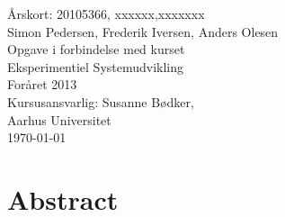 \documentclass[12pt,a4paper,twoside,danish,article]{memoir}
\begin{document}
\frontmatter
\begin{titlingpage}
  \begin{center}
    \mbox{}\vfill
    \vspace{3cm}
    \Large{Årskort: 20105366, xxxxxx,xxxxxxx}\\
    \Large{Simon Pedersen, Frederik Iversen, Anders Olesen}\\
    \vspace{10cm}
    Opgave i forbindelse med kurset\\ Eksperimentiel Systemudvikling\\
    Foråret 2013\\
    \vspace{1cm}
    Kursusansvarlig: Susanne Bødker,\\Aarhus Universitet\\
    \today
  \end{center}
  \clearpage
  \tableofcontents*
\end{titlingpage}

\mainmatter
\setlength{\parskip}{6pt plus 1pt minus 1pt}
\setlength{\parindent}{0cm}
\renewcommand{\baselinestretch}{1.6}\normalsize %

\renewcommand{\chaptermark}[1]{\markboth{\thechapter.
    #1}{\thechapter. #1}} %
\renewcommand{\bibmark}{\markboth{\bibname}{\bibname}} %
\renewcommand{\tocmark}{\markboth{\contentsname}{\contentsname}}


\chapter{Abstract}









\backmatter
\renewcommand{\baselinestretch}{1}\normalsize %

\end{document}
